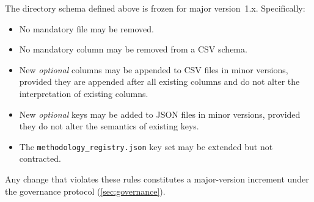The directory schema defined above is frozen for major version~1.x.
Specifically:

\begin{itemize}
  \item No mandatory file may be removed.
  \item No mandatory column may be removed from a CSV schema.
  \item New \emph{optional} columns may be appended to CSV files in minor
    versions, provided they are appended after all existing columns and do
    not alter the interpretation of existing columns.
  \item New \emph{optional} keys may be added to JSON files in minor
    versions, provided they do not alter the semantics of existing keys.
  \item The \texttt{methodology\_registry.json} key set may be extended but
    not contracted.
\end{itemize}

Any change that violates these rules constitutes a major-version increment
under the governance protocol (\cref{sec:governance}).

